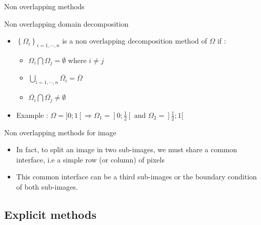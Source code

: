 \documentclass[compress,10pt,aspectratio=169]{beamer}
\begin{document}
\begin{frame}[fragile]{Non overlapping methods}
  \scriptsize
  \begin{block}{\small Non overlapping domain decomposition}
    \begin{itemize}
      \item $\left\{\Omega_{i}\right\}_{i=1,\cdots,n}$ is a non overlapping decomposition method of $\Omega$ if :
      \begin{itemize}
        \item {\scriptsize $\Omega_{i} \bigcap \Omega_{j} = \emptyset$ where $i\neq j$}
        \item {\scriptsize $\displaystyle \bigcup_{i=1,\cdots,n}\overline{\Omega_{i}} = \overline{\Omega}$}
        \item {\scriptsize $\overline{\Omega_{i}} \bigcap \overline{\Omega_{j}} \neq \emptyset$}
      \end{itemize}
      \item Example : $\Omega = ]0;1[ \Rightarrow \Omega_{1} = ]0;\frac{1}{2}[ \mbox{ and } \Omega_{2} = ]\frac{1}{2};1[$
    \end{itemize}
  \end{block}

  \begin{exampleblock}{\small Non overlapping methods for image}
    \begin{itemize}
      \item In fact, to split an image in two sub-images, we must share a common interface, i.e a simple row (or column) of pixels
      \item This common interface can be a third sub-images or the boundary condition of both sub-images.
    \end{itemize}
  \end{exampleblock}
\end{frame}

\subsection{Explicit methods}
\end{document}
